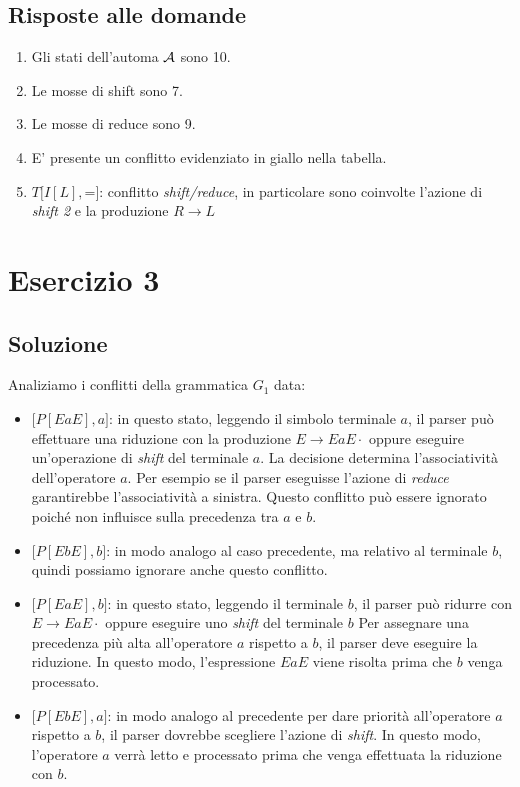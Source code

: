 \documentclass[11pt]{article}
\begin{document}
\subsection{Risposte alle domande}

\begin{enumerate}
  \item Gli stati dell'automa $\cal A$ sono 10.
  \item Le mosse di shift sono 7.
  \item Le mosse di reduce sono 9.
  \item E' presente un conflitto evidenziato in giallo nella tabella.
  \item $T\big[I[L], $=$\big]$: conflitto \textit{shift/reduce}, in particolare 
  sono coinvolte l'azione di \textit{shift 2} e la produzione $R\rightarrow L$
\end{enumerate}

\section{Esercizio 3}
\subsection{Soluzione}
Analiziamo i conflitti della grammatica $G_1$ data:
\begin{itemize}
  \item $\big[P[EaE], a\big]$: in questo stato, leggendo il simbolo terminale $a$, il parser può
effettuare una riduzione con la produzione $E \rightarrow EaE\cdot$ oppure eseguire 
un'operazione di \textit{shift} del terminale $a$.
La decisione determina l'associatività dell'operatore $a$. Per esempio se il parser 
eseguisse l'azione di \textit{reduce} garantirebbe l'associatività a sinistra. Questo 
conflitto può essere ignorato poiché non influisce sulla precedenza tra $a$ e $b$.
  
\item $\big[P[EbE], b\big]$: in modo analogo al caso precedente, ma relativo al terminale $b$, quindi possiamo ignorare anche questo conflitto.
    
\item $\big[P[EaE], b\big]$: in questo stato, leggendo il terminale $b$, il parser può ridurre 
con $E \rightarrow EaE\cdot$ oppure eseguire uno \textit{shift} del terminale $b$
Per assegnare una precedenza più alta all'operatore $a$ rispetto a $b$, il parser deve 
eseguire la riduzione. In questo modo, l'espressione $EaE$ viene risolta prima che 
$b$ venga processato.
  
\item $\big[P[EbE], a\big]$: in modo analogo al precedente per dare priorità 
all'operatore $a$ rispetto a $b$, il parser dovrebbe scegliere l'azione di \textit{shift}. 
In questo modo, l'operatore $a$ verrà letto e processato prima che venga effettuata la riduzione con $b$.
\end{itemize}
\end{document}
